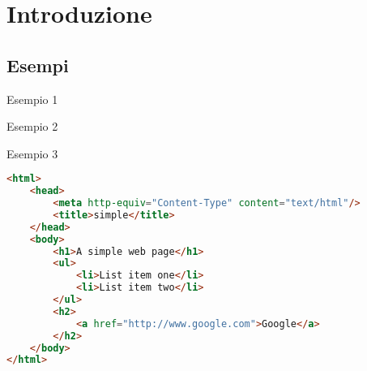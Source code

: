 \FrameContent

\section{Introduzione}

\subsection{Esempi}


\begin{frame}{Esempio 1}


\end{frame}

\begin{frame}{Esempio 2}



\end{frame}

\begin{frame}[fragile,shrink=5]{Esempio 3}

\vspace{-12pt}
\begin{lstlisting}[language=html,tabsize=2]
<html>
    <head>
        <meta http-equiv="Content-Type" content="text/html"/>
        <title>simple</title>
    </head>
    <body>
        <h1>A simple web page</h1>
        <ul>
            <li>List item one</li>
            <li>List item two</li>
        </ul>
        <h2>
            <a href="http://www.google.com">Google</a>
        </h2>
    </body>
</html>
\end{lstlisting}

\end{frame}

